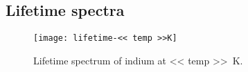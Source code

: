 \documentclass[11pt, english, fleqn, DIV=15, headinclude, BCOR=2cm]{scrreprt}
\begin{document}
\begin{appendix}

    \chapter{Lifetime spectra}

    \begin{figure}[htbp]
        \centering
        \texttt{[image: lifetime-<< temp >>K]}
        \caption{%
            Lifetime spectrum of indium at \SI{<< temp >>}{\kelvin}.
        }
        \label{fig:lifetime-<< temp >>K}
    \end{figure}
\end{appendix}
\end{document}
